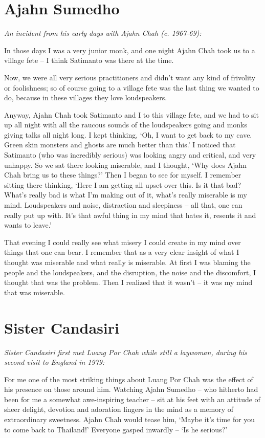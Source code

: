 \section{Ajahn Sumedho}

\emph{An incident from his early days with Ajahn Chah (c. 1967-69):}

In those days I was a very junior monk, and one night Ajahn Chah took us
to a village fete -- I think Satimanto was there at the time. 

Now, we were all very serious practitioners and didn't want any kind of
frivolity or foolishness; so of course going to a village fete was the
last thing we wanted to do, because in these villages they love
loudspeakers. 

Anyway, Ajahn Chah took Satimanto and I to this village fete, and we had
to sit up all night with all the raucous sounds of the loudspeakers
going and monks giving talks all night long. I kept thinking, `Oh, I
want to get back to my cave. Green skin monsters and ghosts are much
better than this.' I noticed that Satimanto (who was incredibly serious) 
was looking angry and critical, and very unhappy. So we sat there
looking miserable, and I thought, `Why does Ajahn Chah bring us to these
things?' Then I began to see for myself. I remember sitting there
thinking, `Here I am getting all upset over this. Is it that bad? What's
really bad is what I'm making out of it, what's really miserable is my
mind. Loudspeakers and noise, distraction and sleepiness -- all that, 
one can really put up with. It's that awful thing in my mind that hates
it, resents it and wants to leave.'

That evening I could really see what misery I could create in my mind
over things that one can bear. I remember that as a very clear insight
of what I thought was miserable and what really is miserable. At first I
was blaming the people and the loudspeakers, and the disruption, the
noise and the discomfort, I thought that was the problem. Then I
realized that it wasn't -- it was my mind that was miserable. 

\section{Sister Candasiri}

\emph{Sister Candasiri first met Luang Por Chah while still a
laywoman, during his second visit to England in 1979:}

For me one of the most striking things about Luang Por Chah was the
effect of his presence on those around him. Watching Ajahn Sumedho --
who hitherto had been for me a somewhat awe-inspiring teacher -- sit at
his feet with an attitude of sheer delight, devotion and adoration
lingers in the mind as a memory of extraordinary sweetness. Ajahn Chah
would tease him, `Maybe it's time for you to come back to Thailand!'
Everyone gasped inwardly -- `Is he serious?'

